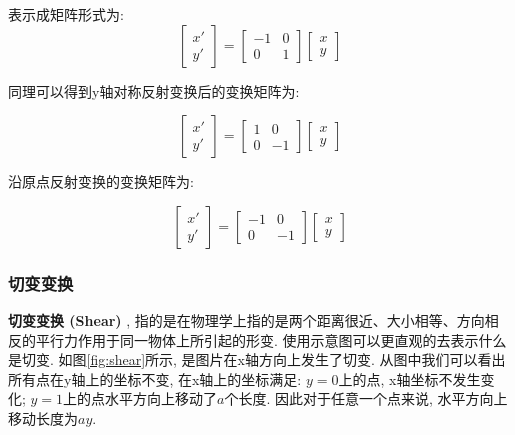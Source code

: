 \documentclass[openany]{progbookcn}
\begin{document}
表示成矩阵形式为: 
\begin{equation}
	\begin{bmatrix}
	x' \\
	y'
\end{bmatrix} = \begin{bmatrix}
-1&0\\0&1\end{bmatrix}\begin{bmatrix}x\\y\end{bmatrix}
\end{equation}

同理可以得到y轴对称反射变换后的变换矩阵为: 

\begin{equation}
	\begin{bmatrix}
		x' \\
		y'
	\end{bmatrix} = \begin{bmatrix}
		1&0\\0&-1\end{bmatrix}\begin{bmatrix}x\\y\end{bmatrix}
\end{equation}

沿原点反射变换的变换矩阵为: 

\begin{equation}
	\begin{bmatrix}
		x' \\
		y'
	\end{bmatrix} = \begin{bmatrix}
		-1&0\\0&-1\end{bmatrix}\begin{bmatrix}x\\y\end{bmatrix}
\end{equation}

\subsubsection{切变变换}

\textbf{切变变换 (Shear) }, 指的是在物理学上指的是两个距离很近、大小相等、方向相反的平行力作用于同一物体上所引起的形变. 使用示意图可以更直观的去表示什么是切变. 如图\ref{fig:shear}所示, 是图片在x轴方向上发生了切变. 从图中我们可以看出所有点在y轴上的坐标不变, 在x轴上的坐标满足: $y=0$上的点, x轴坐标不发生变化; $y=1$上的点水平方向上移动了$a$个长度. 因此对于任意一个点来说, 水平方向上移动长度为$ay$. 
\end{document}
